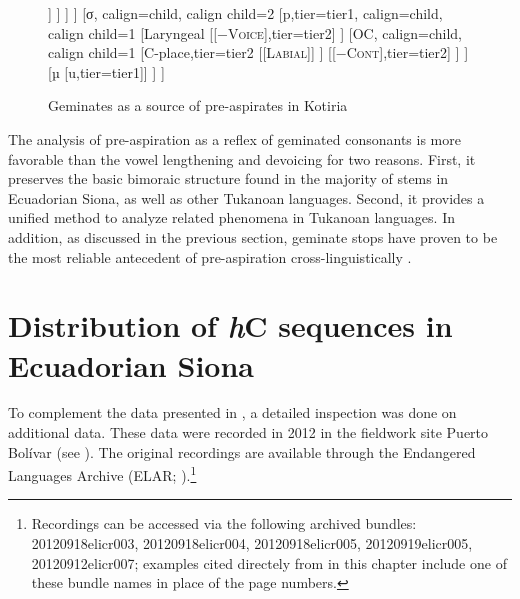 \documentclass[output=paper]{langscibook}
\begin{document}
\begin{figure}
\begin{forest}
[,phantom
  [σ, calign=child, calign child=2
    [d,tier=tier1]
    [µ, calign=child, calign child=1
       [a,tier=tier1] 
       [p,tier=tier1
	       [Laryngeal, tier=lonetier, l*=2
		       [{[−\textsc{Voice}] → [\textsc{Sprd.Glt.}]},tier=tier2, anchor=base east]
	       ]
       ] 
    ]
  ]
  [σ, calign=child, calign child=2
    [p,tier=tier1, calign=child, calign child=1
	    [Laryngeal
	      [{[−\textsc{Voice}]},tier=tier2]
	    ]
	    [OC, calign=child, calign child=1
	      [C-place,tier=tier2
	        [{[\textsc{Labial}]}]
	      ]
		  [{[−\textsc{Cont}]},tier=tier2]  
	    ]
    ]
    [µ [u,tier=tier1]]
  ]
]
\end{forest}
\caption{Geminates as a source of pre-aspirates in Kotiria \citep[27]{Stenzel:2013}}\label{exe-dia-debucc}
\end{figure}

The analysis of pre-aspiration as a reflex of geminated consonants is more favorable than the vowel lengthening and devoicing for two reasons. First, it preserves the basic bimoraic structure found in the majority of stems in Ecuadorian Siona, as well as other Tukanoan languages. Second, it provides a unified method to analyze related phenomena in Tukanoan languages. In addition, as discussed in the previous section, geminate stops have proven to be the most reliable antecedent of pre-aspiration cross-linguistically \citep{Clayton:2010}.




\section{Distribution of \textit{h}C sequences in Ecuadorian Siona}\label{sec-desc}\label{sec-ES}
To complement the data presented in \citet{Bruil:2014}, a detailed inspection was done on additional data. These data were recorded in 2012 in the fieldwork site Puerto Bol\'ivar (see ). The original recordings are available through the Endangered Languages Archive (ELAR; \citealt{Bruil:2012}).\footnote{Recordings can be accessed via the following archived bundles: 20120918elicr003, 20120918elicr004, 20120918elicr005, 20120919elicr005, 20120912elicr007; examples cited directely from \citet{Bruil:2012} in this chapter include one of these bundle names in place of the page numbers.}
\end{document}
